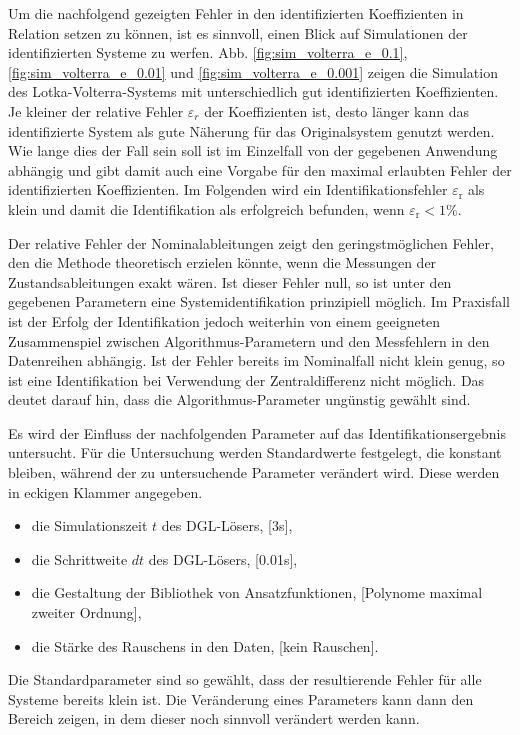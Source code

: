Um die nachfolgend gezeigten Fehler in den identifizierten Koeffizienten in Relation setzen zu können, ist es sinnvoll, einen Blick auf Simulationen der identifizierten Systeme zu werfen. Abb. \ref{fig:sim_volterra_e_0.1},  \ref{fig:sim_volterra_e_0.01} und \ref{fig:sim_volterra_e_0.001} zeigen die Simulation des Lotka-Volterra-Systems mit unterschiedlich gut identifizierten Koeffizienten. Je kleiner der relative Fehler $\varepsilon_r$ der Koeffizienten ist, desto länger kann das identifizierte System als gute Näherung für das Originalsystem genutzt werden. Wie lange dies der Fall sein soll ist im Einzelfall von der gegebenen Anwendung abhängig und gibt damit auch eine Vorgabe für den maximal erlaubten Fehler der identifizierten Koeffizienten. Im Folgenden wird ein Identifikationsfehler $\varepsilon_\text{r}$ als klein und damit die Identifikation als erfolgreich befunden, wenn $\varepsilon_\text{r} < 1\%$. 

Der relative Fehler der Nominalableitungen zeigt den geringstmöglichen Fehler, den die Methode theoretisch erzielen könnte, wenn die Messungen der Zustandsableitungen exakt wären. Ist dieser Fehler null, so ist unter den gegebenen Parametern eine Systemidentifikation prinzipiell möglich. Im Praxisfall ist der Erfolg der Identifikation jedoch weiterhin von einem geeigneten Zusammenspiel zwischen Algorithmus-Parametern und den Messfehlern in den Datenreihen abhängig. Ist der Fehler bereits im Nominalfall nicht klein genug, so ist eine Identifikation bei Verwendung der Zentraldifferenz nicht möglich. Das deutet darauf hin, dass die Algorithmus-Parameter ungünstig gewählt sind.




Es wird der Einfluss der nachfolgenden Parameter auf das Identifikationsergebnis untersucht. Für die Untersuchung werden Standardwerte festgelegt, die konstant bleiben, während der zu untersuchende Parameter verändert wird. Diese werden in eckigen Klammer angegeben.
\begin{itemize}
\item die Simulationszeit $t$ des DGL-Lösers, [3s],
\item die Schrittweite $dt$ des DGL-Lösers, [0.01s], 
\item die Gestaltung der Bibliothek von Ansatzfunktionen, [Polynome maximal zweiter Ordnung],
\item die Stärke des Rauschens in den Daten, [kein Rauschen].
\end{itemize}
Die Standardparameter sind so gewählt, dass der resultierende Fehler für alle Systeme bereits klein ist. Die Veränderung eines Parameters kann dann den Bereich zeigen, in dem dieser noch sinnvoll verändert werden kann.

